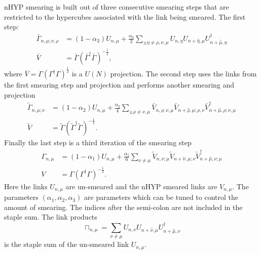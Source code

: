 nHYP smearing is built out of three consecutive smearing steps that are restricted to the hypercubes associated with the link being smeared.
The first step:
\begin{align}
  \bar{\Gamma}_{n,\mu;\nu,\rho}&=(1-\alpha_3)U_{n,\mu}+\frac{\alpha_3}{2}\sum_{\pm\eta\neq\rho,\nu,\mu}U_{n,\eta}U_{n+\hat{\eta},\mu}U^\dagger_{n+\hat{\mu},\eta} \\
  \bar{V}&=\bar{\Gamma}(\bar{\Gamma}^\dagger\bar{\Gamma})^{-\frac{1}{2}},
\end{align}
where $\bar{V}=\Gamma(\Gamma^\dagger\Gamma)^\frac{1}{2}$ is a $U(N)$ projection.
The second step uses the links from the first smearing step and projection and performs another smearing and projection
\begin{align}
  \widetilde{\Gamma}_{n,\mu;\nu}&=(1-\alpha_2)U_{n,\mu}+\frac{\alpha_2}{4}\sum_{\pm\rho\neq\nu,\mu}\bar{V}_{n,\rho;\nu,\mu}\bar{V}_{n+\hat{\rho},\mu;\rho,\nu}\bar{V}^\dagger_{n+\hat{\mu},\rho;\nu,\mu} \\
  \widetilde{V}&=\widetilde{\Gamma}(\widetilde{\Gamma}^\dagger\widetilde{\Gamma})^{-\frac{1}{2}}.
\end{align}
Finally the last step is a third iteration of the smearing step
\begin{align}
  \Gamma_{n,\mu}&=(1-\alpha_1)U_{n,\mu}+\frac{\alpha_1}{6}\sum_{\nu\neq\mu}\widetilde{V}_{n,\nu;\mu}\widetilde{V}_{n+\hat{\nu},\mu;\nu}\widetilde{V}^\dagger_{n+\hat{\mu},\nu;\mu} \\
  V&=\Gamma(\Gamma^\dagger\Gamma)^{-\frac{1}{2}}.
\end{align}
Here the links $U_{n,\mu}$ are un-smeared and the nHYP smeared links are $V_{n,\mu}$.
The parameters $(\alpha_1,\alpha_2,\alpha_3)$ are parameters which can be tuned to control the amount of smearing.
The indices after the semi-colon are not included in the staple sum.
The link products
\begin{equation}
  \sqcap_{n,\mu}=\sum_{\nu\neq\mu}U_{n,\nu}U_{n+\hat{\nu},\mu}U^\dagger_{n+\hat{\mu},\nu}
\end{equation}
is the staple sum of the un-smeared link $U_{n,\mu}$.
